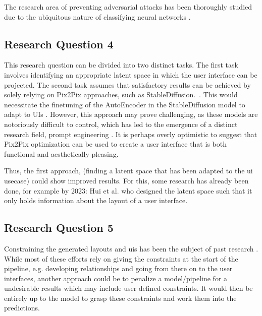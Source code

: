 \documentclass[10pt,a4paper]{scrartcl} %
\begin{document}
The research area of preventing adversarial attacks has been thoroughly studied due to the ubiquitous nature of classifying neural networks \cite{9466420}. 


\subsection{Research Question 4}
This research question can be divided into two distinct tasks. The first task involves identifying an appropriate latent space in which the user interface can be projected. The second task assumes that satisfactory results can be achieved by solely relying on Pix2Pix approaches, such as StableDiffusion.~\cite{rombach2021highresolution}. This would necessitate the finetuning of the AutoEncoder in the StableDiffusion model to adapt to UIs \cite{ruiz2023dreambooth}. However, this approach may prove challenging, as these models are notoriously difficult to control, which has led to the emergence of a distinct research field, prompt engineering \cite{gu2023systematic}. It is perhaps overly optimistic to suggest that Pix2Pix optimization can be used to create a user interface that is both functional and aesthetically pleasing.

Thus, the first approach, (finding a latent space that has been adapted to the \ac{ui} usecase) could show improved results. For this, some research has already been done, for example by 2023: Hui et al. \cite{hui2023unifying} who designed the latent space such that it only holds information about the layout of a user interface.

\subsection{Research Question 5}
Constraining the generated layouts and \ac{uis} has been the subject of past research \cite{lee2020neural}.  While most of these efforts rely on giving the constraints at the start of the pipeline, e.g. developing relationships and going from there on to the user interfaces, another approach could be to penalize a model/pipeline for a undesirable results which may include user defined constraints. It would then be entirely up to the model to grasp these constraints and work them into the predictions.
\end{document}
